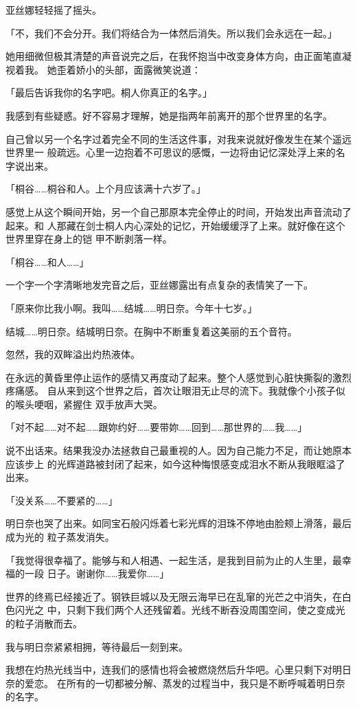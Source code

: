 \documentclass[11pt]{book}
\begin{document}
亚丝娜轻轻摇了摇头。

「不，我们不会分开。我们将结合为一体然后消失。所以我们会永远在一起。」

她用细微但极其清楚的声音说完之后，在我怀抱当中改变身体方向，由正面笔直凝视着我。
她歪着娇小的头部，面露微笑说道：

「最后告诉我你的名字吧。桐人你真正的名字。」

我感到有些疑惑。好不容易才理解，她是指两年前离开的那个世界里的名字。

自己曾以另一个名字过着完全不同的生活这件事，对我来说就好像发生在某个遥远世界里一
般疏远。心里一边抱着不可思议的感慨，一边将由记忆深处浮上来的名字说出来。

「桐谷……桐谷和人。上个月应该满十六岁了。」

感觉上从这个瞬间开始，另一个自己那原本完全停止的时间，开始发出声音流动了起来。和
人那藏在剑士桐人内心深处的记忆，开始缓缓浮了上来。就好像在这个世界里穿在身上的铠
甲不断剥落一样。

「桐谷……和人……」

一个字一个字清晰地发完音之后，亚丝娜露出有点复杂的表情笑了一下。

「原来你比我小啊。我叫……结城……明日奈。今年十七岁。」

结城……明日奈。结城明日奈。在胸中不断重复着这美丽的五个音符。

忽然，我的双眸溢出灼热液体。

在永远的黄昏里停止运作的感情又再度动了起来。整个人感觉到心脏快撕裂的激烈疼痛感。
自从来到这个世界之后，首次让眼泪无止尽的流下。我就像个小孩子似的喉头哽咽，紧握住
双手放声大哭。

「对不起……对不起……跟妳约好……要带妳……回到……那世界的……我……」

说不出话来。结果我没办法拯救自己最重视的人。因为自己能力不足，而让她原本应该步上
的光辉道路被封闭了起来，如今这种悔恨感变成泪水不断从我眼眶溢了出来。

「没关系……不要紧的……」

明日奈也哭了出来。如同宝石般闪烁着七彩光辉的泪珠不停地由脸颊上滑落，最后成为光的
粒子蒸发消失。

「我觉得很幸福了。能够与和人相遇、一起生活，是我到目前为止的人生里，最幸福的一段
日子。谢谢你……我爱你……」

世界的终焉已经接近了。钢铁巨城以及无限云海早已在乱窜的光芒之中消失，在白色闪光之
中，只剩下我们两个人还残留着。光线不断吞没周围空间，使之变成光的粒子消散而去。

我与明日奈紧紧相拥，等待最后一刻到来。

我想在灼热光线当中，连我们的感情也将会被燃烧然后升华吧。心里只剩下对明日奈的爱恋。
在所有的一切都被分解、蒸发的过程当中，我只是不断呼喊着明日奈的名字。
\end{document}
